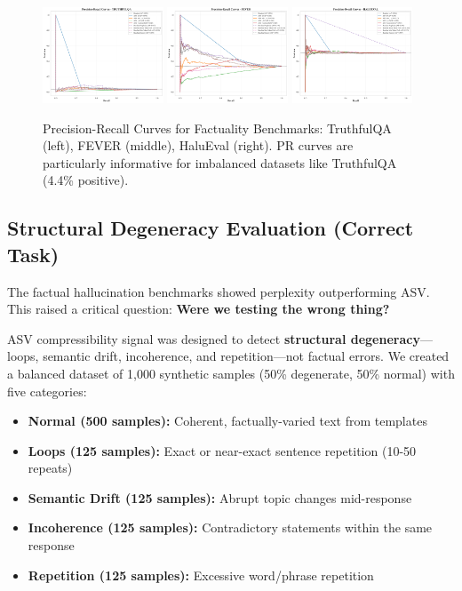 \documentclass[11pt]{article}
\begin{document}
\begin{figure}[h]
\centering
\includegraphics[width=0.32\textwidth]{figures/truthfulqa_pr_curves.png}
\includegraphics[width=0.32\textwidth]{figures/fever_pr_curves.png}
\includegraphics[width=0.32\textwidth]{figures/halueval_pr_curves.png}
\caption{Precision-Recall Curves for Factuality Benchmarks: TruthfulQA (left), FEVER (middle), HaluEval (right). PR curves are particularly informative for imbalanced datasets like TruthfulQA (4.4\% positive).}
\label{fig:factuality-pr}
\end{figure}

\subsection{Structural Degeneracy Evaluation (Correct Task)}
\label{sec:eval-degeneracy}

The factual hallucination benchmarks showed perplexity outperforming ASV. This raised a critical question: \textbf{Were we testing the wrong thing?}

ASV compressibility signal was designed to detect \textbf{structural degeneracy}---loops, semantic drift, incoherence, and repetition---not factual errors. We created a balanced dataset of 1,000 synthetic samples (50\% degenerate, 50\% normal) with five categories:

\begin{itemize}
\item \textbf{Normal (500 samples):} Coherent, factually-varied text from templates
\item \textbf{Loops (125 samples):} Exact or near-exact sentence repetition (10-50 repeats)
\item \textbf{Semantic Drift (125 samples):} Abrupt topic changes mid-response
\item \textbf{Incoherence (125 samples):} Contradictory statements within the same response
\item \textbf{Repetition (125 samples):} Excessive word/phrase repetition
\end{itemize}
\end{document}
